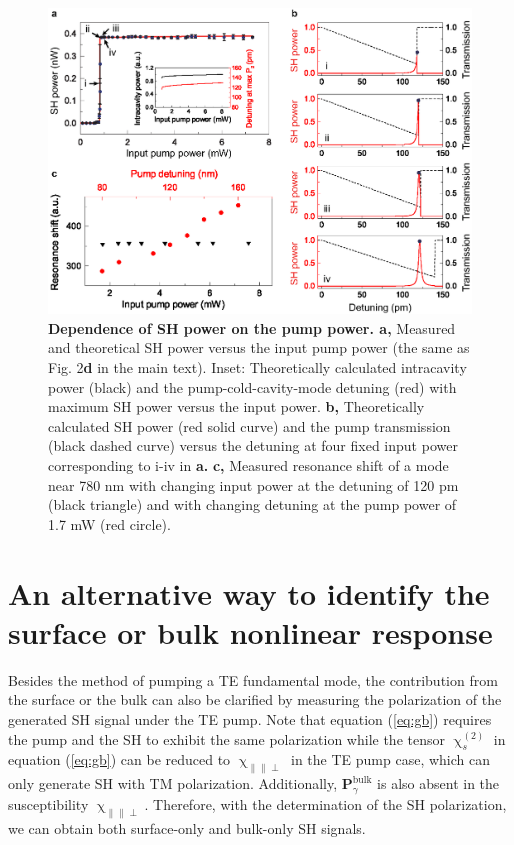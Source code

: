 \documentclass[a4paper,8pt,hyperref, aps, prl]{article}
\begin{document}
\begin{figure}[!ht]
\centering
\includegraphics[width=16cm]{FigS1.eps}
\caption{\textbf{Dependence of SH power on the pump power. a, }Measured and theoretical SH power versus the input pump power (the same as Fig. 2\textbf{d} in the main text). Inset: Theoretically calculated intracavity power (black) and the pump-cold-cavity-mode detuning (red) with maximum SH power versus the input power. \textbf{b, }Theoretically calculated SH power (red solid curve) and the pump transmission (black dashed curve) versus the detuning at four fixed input power corresponding to i-iv in \textbf{a.} \textbf{c, } Measured resonance shift of a mode near 780 nm with changing input power at the detuning of 120 pm (black triangle) and with changing detuning at the pump power of 1.7 mW (red circle).}
\label{pic:FigS1}
\end{figure}

\section{An alternative way to identify the surface or bulk nonlinear response}

Besides the method of pumping a TE fundamental mode, the contribution from the surface or the bulk can also be clarified by measuring the polarization of the generated SH signal under the TE pump. Note that equation (\ref{eq:gb}) requires the pump and the SH to exhibit the same polarization while the tensor $\upchi^{(2)}_s$ in equation (\ref{eq:gb}) can be reduced to $\upchi_{\parallel \parallel \perp}$ in the TE pump case, which can only generate SH with TM polarization. 
Additionally, $\mathbf{P}^{\mathrm{bulk}}_\gamma$ is also absent in the  susceptibility $\upchi_{\parallel \parallel \perp}$. 
Therefore, with the determination of the SH polarization, we can obtain both surface-only and bulk-only SH signals.




\end{document}
